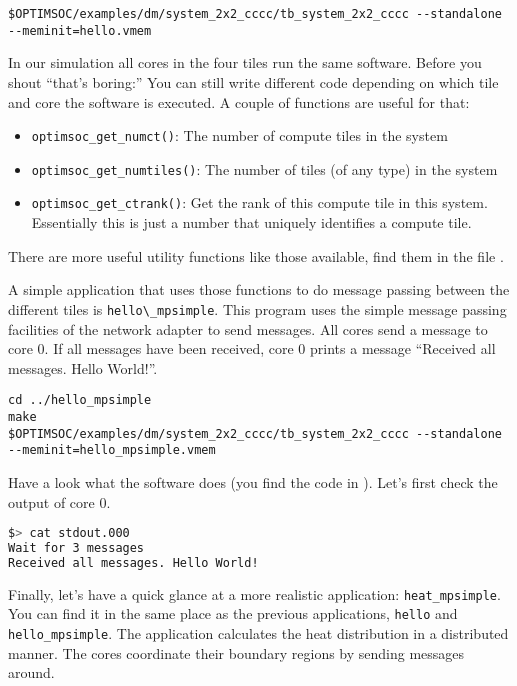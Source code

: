 \begin{lstlisting}
$OPTIMSOC/examples/dm/system_2x2_cccc/tb_system_2x2_cccc --standalone --meminit=hello.vmem
\end{lstlisting}

In our simulation all cores in the four tiles run the same
software. Before you shout ``that's boring:'' You can still write
different code depending on which tile and core the software is
executed. A couple of functions are useful for that:

\begin{itemize}
  \item \verb|optimsoc_get_numct()|: The number of compute tiles in the system
  \item \verb|optimsoc_get_numtiles()|: The number of tiles (of any type) in
    the system
  \item \verb|optimsoc_get_ctrank()|: Get the rank of this compute tile in this
    system. Essentially this is just a number that uniquely identifies a
    compute tile.
\end{itemize}

There are more useful utility functions like those available, find them in the
file .

A simple application that uses those functions to do message passing between
the different tiles is \verb|hello\_mpsimple|. This program uses
the simple message passing facilities of the network adapter to send messages.
All cores send a message to core 0. If all messages have been received, core 0
prints a message ``Received all messages. Hello World!''.

\begin{lstlisting}
cd ../hello_mpsimple
make
$OPTIMSOC/examples/dm/system_2x2_cccc/tb_system_2x2_cccc --standalone --meminit=hello_mpsimple.vmem
\end{lstlisting}

Have a look what the software does (you find the code in
). Let's
first check the output of core 0.

\begin{lstlisting}[language=sh]
$> cat stdout.000
Wait for 3 messages
Received all messages. Hello World!
\end{lstlisting}

\vspace{2em}

Finally, let's have a quick glance at a more realistic application:
\verb|heat_mpsimple|. You can find it in the same place as the previous
applications, \verb|hello| and \verb|hello_mpsimple|. The application
calculates the heat distribution in a distributed manner. The cores coordinate
their boundary regions by sending messages around.

